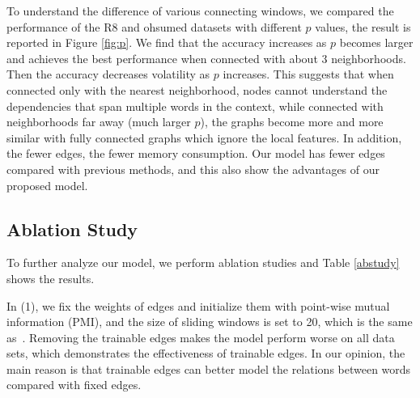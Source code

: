 \documentclass[11pt,a4paper]{article}
\begin{document}
\fi
To understand the difference of various connecting windows, we compared the performance of the R8 and ohsumed datasets with different $p$ values, the result is reported in Figure \ref{fig:p}. We find that the accuracy increases as $p$ becomes larger and achieves the best performance when connected with about 3 neighborhoods. Then the accuracy decreases volatility as $p$ increases. This suggests that when connected only with the nearest neighborhood, nodes cannot understand the dependencies that span multiple words in the context, while connected with neighborhoods far away (much larger $p$), the graphs become more and more similar with fully connected graphs which ignore the local features. 
In addition, the fewer edges, the fewer memory consumption. Our model has fewer edges compared with previous methods, and this also show the advantages of our proposed model.









\subsection{Ablation Study}
To further analyze our model, we perform ablation studies and Table \ref{abstudy} shows the results.
\begin{table}[t]
\centering
\footnotesize
{}
\caption{\label{abstudy} Results of ablation studies. We run all models for 5 times and give mean results. }


\end{table}

In (1), we fix the weights of edges and initialize them with point-wise mutual information (PMI), and the size of sliding windows is set to 20, which is the same as~\cite{yao2018graph}. Removing the trainable edges makes the model perform worse on all data sets, which demonstrates the effectiveness of trainable edges. 
In our opinion, the main reason is that trainable edges can better model the relations between words compared with fixed edges.
\end{document}
